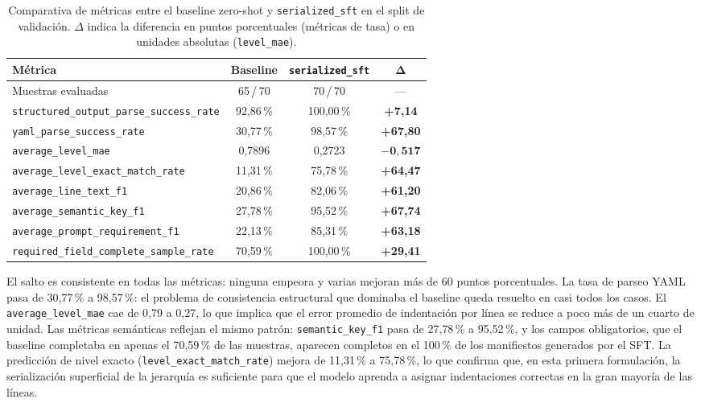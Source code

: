 \begin{table}[htbp]
\centering
\caption{Comparativa de métricas entre el baseline zero-shot y \texttt{serialized\_sft}
         en el split de validación. $\Delta$ indica la diferencia en puntos porcentuales
         (métricas de tasa) o en unidades absolutas (\texttt{level\_mae}).}
\label{tab:ch5_comparison}
\begin{tabular}{lccc}
\toprule
\textbf{Métrica} & \textbf{Baseline} & \textbf{\texttt{serialized\_sft}} & $\boldsymbol{\Delta}$ \\
\midrule
Muestras evaluadas
    & 65\,/\,70 & 70\,/\,70 & --- \\
\texttt{structured\_output\_parse\_success\_rate}
    & 92{,}86\,\% & 100{,}00\,\% & \textbf{+7{,}14} \\
\texttt{yaml\_parse\_success\_rate}
    & 30{,}77\,\% & 98{,}57\,\% & \textbf{+67{,}80} \\
\texttt{average\_level\_mae}
    & 0{,}7896 & 0{,}2723 & $\mathbf{-0{,}517}$ \\
\texttt{average\_level\_exact\_match\_rate}
    & 11{,}31\,\% & 75{,}78\,\% & \textbf{+64{,}47} \\
\texttt{average\_line\_text\_f1}
    & 20{,}86\,\% & 82{,}06\,\% & \textbf{+61{,}20} \\
\texttt{average\_semantic\_key\_f1}
    & 27{,}78\,\% & 95{,}52\,\% & \textbf{+67{,}74} \\
\texttt{average\_prompt\_requirement\_f1}
    & 22{,}13\,\% & 85{,}31\,\% & \textbf{+63{,}18} \\
\texttt{required\_field\_complete\_sample\_rate}
    & 70{,}59\,\% & 100{,}00\,\% & \textbf{+29{,}41} \\
\bottomrule
\end{tabular}
\end{table}

El salto es consistente en todas las métricas: ninguna empeora y varias mejoran más de 60 puntos porcentuales. La tasa de parseo YAML pasa de 30{,}77\,\% a
98{,}57\,\%: el problema de consistencia estructural que dominaba el baseline queda resuelto en
casi todos los casos. El \texttt{average\_level\_mae} cae de 0{,}79 a 0{,}27, lo que implica
que el error promedio de indentación por línea se reduce a poco más de un cuarto de unidad. Las
métricas semánticas reflejan el mismo patrón: \texttt{semantic\_key\_f1} pasa de 27{,}78\,\%
a 95{,}52\,\%, y los campos obligatorios, que el baseline completaba en apenas el 70{,}59\,\%
de las muestras, aparecen completos en el 100\,\% de los manifiestos generados por el SFT. La
predicción de nivel exacto (\texttt{level\_exact\_match\_rate}) mejora de 11{,}31\,\% a
75{,}78\,\%, lo que confirma que, en esta primera formulación, la serialización superficial de la jerarquía es suficiente
para que el modelo aprenda a asignar indentaciones correctas en la gran mayoría de las líneas.


